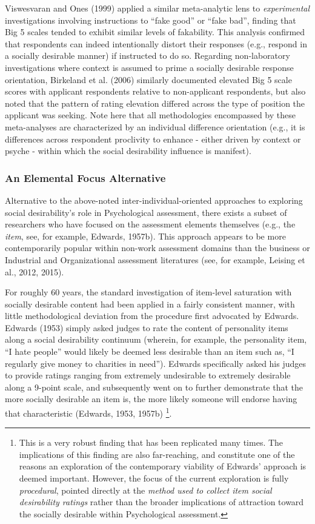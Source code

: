 \documentclass[
  ,jou]{apa6}
\begin{document}
Viswesvaran and Ones (1999) applied a similar meta-analytic lens to \emph{experimental} investigations involving instructions to ``fake good'' or ``fake bad'', finding that Big 5 scales tended to exhibit similar levels of fakability. This analysis confirmed that respondents can indeed intentionally distort their responses (e.g., respond in a socially desirable manner) if instructed to do so. Regarding non-laboratory investigations where context is assumed to prime a socially desirable response orientation, Birkeland et al. (2006) similarly documented elevated Big 5 scale scores with applicant respondents relative to non-applicant respondents, but also noted that the pattern of rating elevation differed across the type of position the applicant was seeking. Note here that all methodologies encompassed by these meta-analyses are characterized by an individual difference orientation (e.g., it is differences across respondent proclivity to enhance - either driven by context or psyche - within which the social desirability influence is manifest).

\hypertarget{an-elemental-focus-alternative}{%
\subsubsection{An Elemental Focus Alternative}\label{an-elemental-focus-alternative}}

Alternative to the above-noted inter-individual-oriented approaches to exploring social desirability's role in Psychological assessment, there exists a subset of researchers who have focused on the assessment elements themselves (e.g., the \emph{item}, see, for example, Edwards, 1957b). This approach appears to be more contemporarily popular within non-work assessment domains than the business or Industrial and Organizational assessment literatures (see, for example, Leising et al., 2012, 2015).

For roughly 60 years, the standard investigation of item-level saturation with socially desirable content had been applied in a fairly consistent manner, with little methodological deviation from the procedure first advocated by Edwards. Edwards (1953) simply asked judges to rate the content of personality items along a social desirability continuum (wherein, for example, the personality item, ``I hate people'' would likely be deemed less desirable than an item such as, ``I regularly give money to charities in need''). Edwards specifically asked his judges to provide ratings ranging from extremely undesirable to extremely desirable along a 9-point scale, and subsequently went on to further demonstrate that the more socially desirable an item is, the more likely someone will endorse having that characteristic (Edwards, 1953, 1957b) \footnote{This is a very robust finding that has been replicated many times. The implications of this finding are also far-reaching, and constitute one of the reasons an exploration of the contemporary viability of Edwards' approach is deemed important. However, the focus of the current exploration is fully \emph{procedural}, pointed directly at the \emph{method used to collect item social desirability ratings} rather than the broader implications of attraction toward the socially desirable within Psychological assessment.}.
\end{document}

